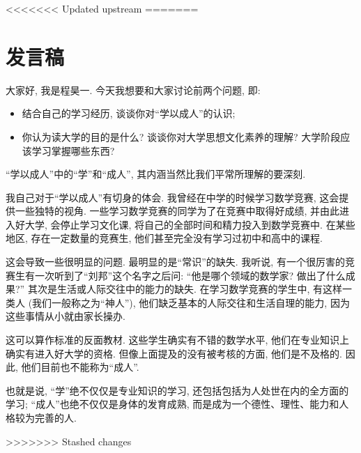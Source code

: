 \documentclass{article}
\begin{document}
<<<<<<< Updated upstream
=======
\section{发言稿}

大家好, 我是程昊一. 今天我想要和大家讨论前两个问题, 即: 
\begin{itemize}
	\item 结合自己的学习经历, 谈谈你对``学以成人''的认识;
	\item 你认为读大学的目的是什么? 谈谈你对大学思想文化素养的理解? 大学阶段应该学习掌握哪些东西?
\end{itemize}

``学以成人''中的``学''和``成人'', 其内涵当然比我们平常所理解的要深刻. 

我自己对于``学以成人''有切身的体会. 我曾经在中学的时候学习数学竞赛, 这会提供一些独特的视角. 一些学习数学竞赛的同学为了在竞赛中取得好成绩, 并由此进入好大学, 会停止学习文化课, 将自己的全部时间和精力投入到数学竞赛中. 在某些地区, 存在一定数量的竞赛生, 他们甚至完全没有学习过初中和高中的课程.

这会导致一些很明显的问题. 最明显的是``常识''的缺失. 我听说, 有一个很厉害的竞赛生有一次听到了``刘邦''这个名字之后问: ``他是哪个领域的数学家? 做出了什么成果?'' 其次是生活或人际交往中的能力的缺失. 在学习数学竞赛的学生中, 有这样一类人 (我们一般称之为``神人''), 他们缺乏基本的人际交往和生活自理的能力, 因为这些事情从小就由家长操办.

这可以算作标准的反面教材. 这些学生确实有不错的数学水平, 他们在专业知识上确实有进入好大学的资格. 但像上面提及的没有被考核的方面, 他们是不及格的. 因此, 他们目前也不能称为``成人''.

也就是说, ``学''绝不仅仅是专业知识的学习, 还包括包括为人处世在内的全方面的学习; ``成人''也绝不仅仅是身体的发育成熟, 而是成为一个德性、理性、能力和人格较为完善的人.  

>>>>>>> Stashed changes
\end{document}
